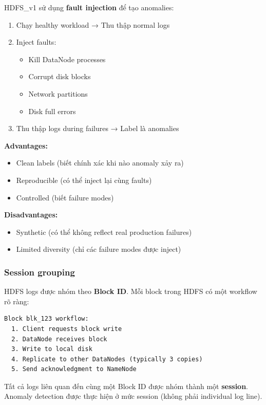 HDFS\_v1 sử dụng \textbf{fault injection} để tạo anomalies:

\begin{enumerate}
    \item Chạy healthy workload → Thu thập normal logs
    \item Inject faults:
    \begin{itemize}
        \item Kill DataNode processes
        \item Corrupt disk blocks
        \item Network partitions
        \item Disk full errors
    \end{itemize}
    \item Thu thập logs during failures → Label là anomalies
\end{enumerate}

\textbf{Advantages:}
\begin{itemize}
    \item Clean labels (biết chính xác khi nào anomaly xảy ra)
    \item Reproducible (có thể inject lại cùng faults)
    \item Controlled (biết failure modes)
\end{itemize}

\textbf{Disadvantages:}
\begin{itemize}
    \item Synthetic (có thể không reflect real production failures)
    \item Limited diversity (chỉ các failure modes được inject)
\end{itemize}

\subsubsection{Session grouping}

HDFS logs được nhóm theo \textbf{Block ID}. Mỗi block trong HDFS có một workflow rõ ràng:

\begin{verbatim}
Block blk_123 workflow:
  1. Client requests block write
  2. DataNode receives block
  3. Write to local disk
  4. Replicate to other DataNodes (typically 3 copies)
  5. Send acknowledgment to NameNode
\end{verbatim}

Tất cả logs liên quan đến cùng một Block ID được nhóm thành một \textbf{session}. Anomaly detection được thực hiện ở mức session (không phải individual log line).

